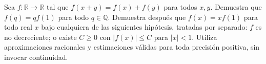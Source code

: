 \begin{samepage}
\begin{problem}\label{prob:reto-densidad-10}
Sea $f:\mathbb R\to\mathbb R$ tal que $f(x+y)=f(x)+f(y)$ para todos $x,y$. Demuestra que $f(q)=qf(1)$ para todo $q\in\mathbb Q$. Demuestra después que $f(x)=xf(1)$ para todo real $x$ bajo cualquiera de las siguientes hipótesis, tratadas por separado: $f$ es no decreciente; o existe $C\ge0$ con $|f(x)|\le C$ para $|x|<1$. Utiliza aproximaciones racionales y estimaciones válidas para toda precisión positiva, sin invocar continuidad.~\cite{mseAditiva}
\end{problem}
\end{samepage}
\par{}

